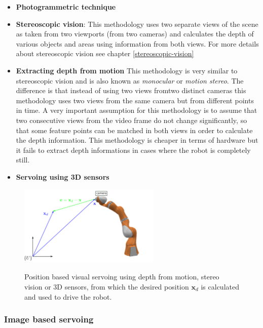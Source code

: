 \begin{itemize}
\item \textbf{Photogrammetric technique}
\item \textbf{Stereoscopic vision}: This methodology uses two separate views of the scene as taken from two viewports (from two cameras) 
and calculates the depth of various objects and areas using information from both views. For more details about stereoscopic vision see chapter \ref{stereoscopic-vision}
\item \textbf{Extracting depth from motion} This methodology is very similar to stereoscopic vision and is also known as \textit{monocular} or \textit{motion stereo}. The difference is that instead of using two views fromtwo distinct cameras this methodology 
uses two views from the same camera but from different points in time. A very important assumption for this methodology is to assume that two consecutive views from the video frame do not change significantly, so that some feature points can be matched in both views in order to calculate the depth information. This methodology 
is cheaper in terms of hardware but it fails to extract depth informations in cases where the robot is completely still.
\item \textbf{Servoing using 3D sensors}
\end{itemize}

\begin{center}
\begin{figure}[H]
\centering
\includegraphics[width=0.6\textwidth]{images/visual-servoing-position-based2.png}\\
\caption{Position based visual servoing using depth from motion, stereo vision or 3D sensors, from which the desired position $\mathbf{x}_d$ is calculated and 
used to drive the robot.}
\end{figure}
\end{center}

\subsubsection{Image based servoing}

